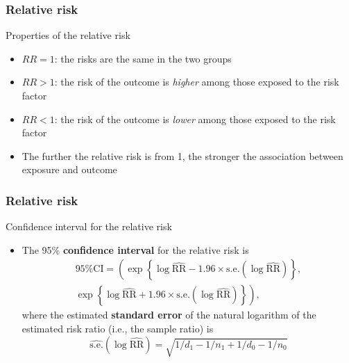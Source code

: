 \documentclass[compress, notes=hide]{beamer}
\newcommand{\hl}[1]{\textbf{#1}}
\begin{document}
 \begin{frame}
 			  \frametitle{Relative risk} 
 \begin{block}{Properties of the relative risk}
 \begin{itemize}
 \item{$RR = 1$: the risks are the same in the two
     groups}
 \item {$RR > 1$: the risk of the outcome is
     \emph{higher} among those exposed to the risk factor}
 \item{$RR < 1$:  the risk of the outcome is
     \emph{lower} among those exposed to the risk factor} 
     
 \hspace*{1em}
 \item The further the relative risk is from 1, the stronger the
   association between exposure and outcome
 \end{itemize}
 \end{block}
 \end{frame}



\begin{frame}
			  \frametitle{Relative risk} 
\begin{block}{Confidence interval for the relative risk}
\begin{itemize}
\item The 95\% \hl{confidence interval} for the relative risk is
\begin{multline}
  \text{95\% CI} = \left( \exp \left\{ \log \widehat{\mathrm{RR}} -
      1.96 \times \mathrm{s.e.} \left( \log \widehat{\mathrm{RR}}
      \right) \right\}, \right. \\ \left. \exp \left\{ \log
      \widehat{\mathrm{RR}} + 1.96 \times \mathrm{s.e.} \left( \log
        \widehat{\mathrm{RR}} \right) \right\} \right),\nonumber
\end{multline}
where the estimated \hl{standard error} of the natural logarithm of
the estimated risk ratio (i.e., the sample ratio) is
\begin{equation}
\widehat{\mathrm{s.e.}}(\log \widehat{\mathrm{RR}}) = \sqrt{1/d_1 -
  1/n_1 + 1/d_0 - 1/n_0} \nonumber
\end{equation}
\end{itemize}
\end{block}
\end{frame}
\end{document}
